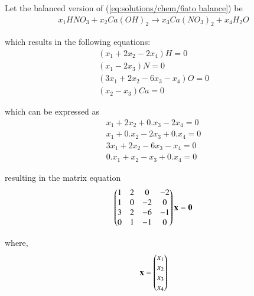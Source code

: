 Let the balanced version of (\ref{eq:solutions/chem/6ato balance}) be
\begin{align}
    \label{eq:solutions/chem/6abalanced}x_{1}HNO_{3}+ x_{2}Ca(OH)_{2}\to x_{3}Ca(NO_{3})_{2}+ x_{4}H_{2}O
\end{align}

which results in the following equations:
\begin{align}
    (x_{1}+ 2x_{2}-2x_{4}) H= 0\\
    (x_{1}-2x_{3}) N= 0\\
    (3x_{1}+ 2x_{2}-6x_{3}- x_{4}) O=0\\
    (x_{2}-x_{3}) Ca= 0
\end{align}

which can be expressed as
\begin{align}
    x_{1}+ 2x_{2}+ 0.x_{3} -2x_{4} = 0\\
    x_{1}+ 0.x_{2} -2x_{3} +0.x_{4}= 0\\
    3x_{1}+ 2x_{2}-6x_{3}- x_{4} =0\\
    0.x_{1} +x_{2}-x_{3} +0.x_{4}= 0
\end{align}

resulting in the matrix equation
\begin{align}
    \label{eq:solutions/chem/6a matrix}
    \begin{pmatrix}1 & 2 & 0 & -2\\
           1 & 0 & -2 & 0\\
           3 & 2 & -6 & -1\\
           0 & 1 & -1 & 0\end{pmatrix}\mathbf{x}
           =\mathbf{0}
\end{align}

where,
\begin{align}
   \mathbf{x}= \begin{pmatrix}x_{1}\\x_{2}\\x_{3}\\x_{4}\end{pmatrix}
\end{align}

